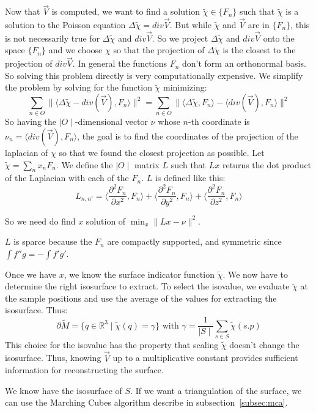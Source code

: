 \documentclass[a4paper]{article}
\begin{document}
Now that $\vec{V}$ is computed, we want to find a solution $\tilde{\chi} \in \{F_n\}$ such that $\tilde{\chi}$ is a solution to the Poisson equation $\Delta\tilde{\chi} = div{\vec{V}}$. But while $\tilde{\chi}$ and $\vec{V}$ are in $\{F_n\}$, this is not necessarily true for $\Delta\tilde{\chi}$ and $div{\vec{V}}$. So we project $\Delta\tilde{\chi}$ and $div{\vec{V}}$ onto the space $\{F_n\}$ and we choose $\chi$ so that the projection of $\Delta\tilde{\chi}$ is the closest to the projection of $div{\vec{V}}$. In general the functions $F_n$ don't form an orthonormal basis. So solving this problem directly is very computationally expensive. We simplify the problem by solving for the function $\tilde{\chi}$ minimizing:
$$\sum_{n \in O}\|\langle\Delta\tilde{\chi}-div(\vec{V}),F_n\rangle\|^2 = \sum_{n \in O}\|\langle\Delta\tilde{\chi},F_n\rangle - \langle div(\vec{V}), F_n\rangle\|^2$$
So having the $\mid O \mid$-dimensional vector $\nu$ whose $n$-th coordinate is $\nu_n = \langle div(\vec{V}), F_n\rangle$, the goal is to find the coordinates of the projection of the laplacian of $\chi$ so that we found the closest projection as possible. Let $\tilde{\chi} = \sum_n x_n F_n$. We define the $\mid O \mid$ matrix $L$ such that $Lx$ returns the dot product of the Laplacian with each of the $F_n$. $L$ is defined like this:
$$L_{n,n'} = \langle\frac{\partial^2F_n}{\partial x^2}, F_n\rangle + \langle\frac{\partial^2F_n}{\partial y^2}, F_n\rangle + \langle\frac{\partial^2F_n}{\partial z^2}, F_n\rangle$$ 

So we need do find $x$ solution of $\min_{x}\|Lx - \nu\|^2$.

$L$ is sparce because the $F_n$ are compactly supported, and symmetric since $\int f''g = -\int f'g'$.

Once we have $x$, we know the surface indicator function $\tilde{\chi}$. We now have to determine the right isosurface to extract. To select the isovalue, we evaluate $\tilde{\chi}$ at the sample positions and use the average of the values for extracting the isosurface. Thus:
$$\partial\tilde{M} = \{q \in \mathbb{R}^3 \mid \tilde{\chi}(q) = \gamma\} \text{ with } \gamma = \frac{1}{\mid S\mid}\sum_{s \in S}\tilde{\chi}(s.p)$$
This choice for the isovalue has the property that scaling $\tilde{\chi}$ doesn't change the isosurface. Thus, knowing $\vec{V}$ up to a multiplicative constant provides sufficient information for reconstructing the surface.

We know have the isosurface of $S$. If we want a triangulation of the surface, we can use the Marching Cubes algorithm describe in subsection~\ref{subsec:mca}.
\end{document}
